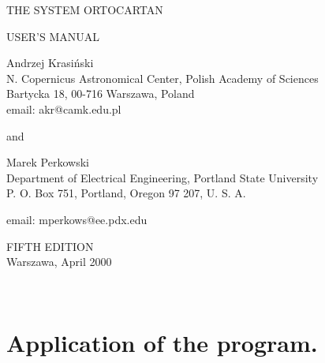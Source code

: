 \hoffset=-0.5in \addtolength{\topmargin}{-30pt}
\addtolength{\textheight}{120pt} \addtolength{\textwidth}{70pt}


\bigskip

\bigskip

\begin{center}

{\huge {THE SYSTEM ORTOCARTAN}} \\

\bigskip

{\huge{USER'S MANUAL}} \\

\vspace{4cm}

{\Large {Andrzej Krasi\'nski}} \\

{\large{N. Copernicus Astronomical Center, Polish Academy of Sciences}} \\

{\large{Bartycka 18, 00-716 Warszawa, Poland}} \\

email: akr@camk.edu.pl \\

\bigskip

{\large {and}} \\

\bigskip

{\Large{Marek Perkowski}} \\

{\large{Department of Electrical Engineering, Portland State University}} \\

{\large{P. O. Box 751, Portland, Oregon 97 207, U. S. A.}}

email: mperkows@ee.pdx.edu \\

\vspace {10cm}

{\large{FIFTH EDITION}} \\

{\large{Warszawa, April 2000}}

\end{center}

\newpage

\ \ \ \

\newpage

\tableofcontents

\newpage

\setcounter{page}{5}

\section{Application of the program.}

